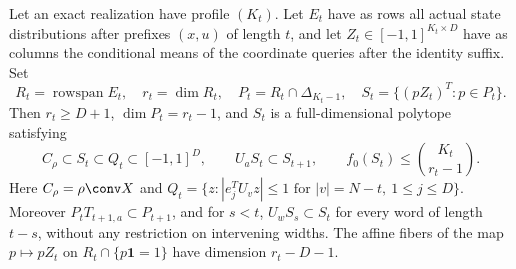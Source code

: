 \begin{theorem}\label{thm:section51}
Let an exact realization have profile $(K_t)$. Let $E_t$ have as rows
all actual state distributions after prefixes $(x,u)$ of length $t$,
and let $Z_t\in[-1,1]^{K_t\times D}$ have as columns the conditional
means of the coordinate queries after the identity suffix. Set
\[
 R_t=\operatorname{rowspan}E_t,\quad r_t=\dim R_t,\quad
 P_t=R_t\cap\Delta_{K_t-1},\quad S_t=\{(pZ_t)^T:p\in P_t\}.
\]
Then $r_t\ge D+1$, $\dim P_t=r_t-1$, and $S_t$ is a
full-dimensional polytope satisfying
\begin{equation}\label{eq:section51}
 C_\rho\subset S_t\subset Q_t\subset[-1,1]^D,\qquad
 U_aS_t\subset S_{t+1},\qquad
 f_0(S_t)\le {K_t\choose r_t-1}.
\end{equation}
Here $C_\rho=\rho\conv X$ and
$Q_t=\{z:|e_j^TU_vz|\le1\text{ for }|v|=N-t,\ 1\le j\le D\}$.
Moreover $P_tT_{t+1,a}\subset P_{t+1}$, and for $s<t$,
$U_wS_s\subset S_t$ for every word of length $t-s$, without any
restriction on intervening widths. The affine fibers of the map
$p\mapsto pZ_t$ on $R_t\cap\{p\mathbf1=1\}$ have dimension
$r_t-D-1$.
\end{theorem}
